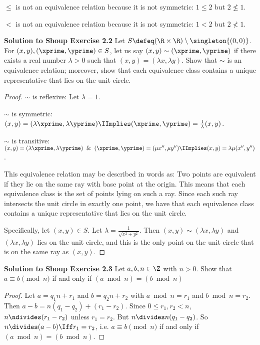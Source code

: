 \documentclass[oneside,12pt]{amsart}
\begin{document}
\bigskip

$\leq$ is not an equivalence relation because it is not symmetric: $1\leq 2$ but $2\not\leq 1$.

\bigskip

$<$ is not an equivalence relation because it is not symmetric: $1<2$ but $2\not<1$.

\bigskip

\textbf{Solution to Shoup Exercise 2.2} Let $S \defeq (\R \times \R) \setminus \singleton{(0,0)}$. For $(x,y), (\xprime,\yprime)\in S$,
let us say $(x,y)\sim(\xprime,\yprime)$ if there exists a real number $\lambda>0$ such that
$(x,y) = (\lambda x, \lambda y)$. Show that $\sim$ is an equivalence relation; moreover, show that each equivalence class contains
a unique representative that lies on the unit circle.

\begin{proof}
$\sim$ is reflexive: Let $\lambda=1$.

\bigskip

$\sim$ is symmetric: $(x,y) = (\lambda \xprime, \lambda \yprime) \IImplies (\xprime,\yprime) = \frac{1}{\lambda}(x,y)$.

\bigskip

$\sim$ is transitive: $(x,y) = (\lambda \xprime, \lambda \yprime)\And(\xprime,\yprime) = (\mu x^{\prime\prime}, \mu y^{\prime\prime})\IImplies
(x,y) = \lambda\mu(x^{\prime\prime}, y^{\prime\prime})$.

\bigskip

This equivalence relation may be described in words as: Two points are equivalent if they lie on the same ray with base point at the origin.
This means that each equivalence class is the set of points lying on such a ray.
Since each such ray intersects the unit circle in exactly one point, we have that each equivalence class contains a unique representative
that lies on the unit circle.

Specifically, let $(x,y)\in S$. Let $\lambda=\frac{1}{\sqrt{x^2+y^2}}$. Then $(x,y)\sim(\lambda x, \lambda y)$ and $(\lambda x, \lambda y)$ lies
on the unit circle, and this is the only point on the unit circle that is on the same ray as $(x,y)$.
\end{proof}

\bigskip

\textbf{Solution to Shoup Exercise 2.3} Let $a,b,n\in\Z$ with $n>0$. Show that $a\equiv b \pmod n$ if and only if
$(a \bmod n) = (b \bmod n)$
\begin{proof}
Let $a=q_1 n + r_1$ and $b=q_2n + r_2$ with $a\bmod n = r_1$ and $b\bmod n = r_2$.
Then $a-b = n(q_1 - q_2) + (r_1 - r_2)$. Since $0\leq r_1,r_2 < n$, $n\ndivides (r_1 - r_2)$
unless $r_1 = r_2$. But $n\divides n(q_1-q_2)$. So $n\divides(a-b) \Iff r_1 = r_2$, i.e.
$a\equiv b \pmod n$ if and only if
$(a \bmod n) = (b \bmod n)$.
\end{proof}
\end{document}
